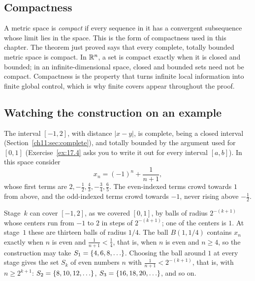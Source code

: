 \subsection*{Compactness}
A metric space is \emph{compact} if every sequence in it has a convergent subsequence whose limit lies in the space. This is the form of compactness used in this chapter. The theorem just proved says that every complete, totally bounded metric space is compact. In $\mathbb R^n$, a set is compact exactly when it is closed and bounded; in an infinite-dimensional space, closed and bounded sets need not be compact. Compactness is the property that turns infinite local information into finite global control, which is why finite covers appear throughout the proof.


\subsection*{Watching the construction on an example}
The interval $[-1,2]$, with distance $|x-y|$, is complete, being a closed interval (Section~\ref{ch11:sec:complete}), and totally bounded by the argument used for $[0,1]$ (Exercise~\ref{ex:17.4} asks you to write it out for every interval $[a,b]$). In this space consider
\[
 x_n=(-1)^n+\frac1{n+1},
\]
whose first terms are $2,-\tfrac12,\tfrac43,-\tfrac34,\tfrac65$. The even-indexed terms crowd towards $1$ from above, and the odd-indexed terms crowd towards $-1$, never rising above $-\tfrac12$.

Stage~$k$ can cover $[-1,2]$, as we covered $[0,1]$, by balls of radius $2^{-(k+1)}$ whose centers run from $-1$ to $2$ in steps of $2^{-(k+1)}$; one of the centers is $1$. At stage~$1$ these are thirteen balls of radius $1/4$. The ball $B(1,1/4)$ contains $x_n$ exactly when $n$ is even and $\tfrac1{n+1}<\tfrac14$, that is, when $n$ is even and $n\ge4$, so the construction may take $S_1=\left\{4,6,8,\ldots\right\}$. Choosing the ball around $1$ at every stage gives the set $S_k$ of even numbers $n$ with $\tfrac1{n+1}<2^{-(k+1)}$, that is, with $n\ge2^{k+1}$: $S_2=\left\{8,10,12,\ldots\right\}$, $S_3=\left\{16,18,20,\ldots\right\}$, and so on.

